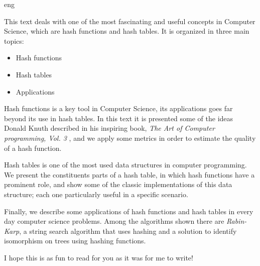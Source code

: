 \begin{resumo}{eng}
  
This text deals with one of the most fascinating and useful concepts in Computer Science, which are hash functions and hash tables. It is organized in three main topics:

\begin{itemize}
   \item Hash functions
   \item Hash tables
   \item Applications
\end{itemize}

Hash functions is a key tool in Computer Science, its applications goes far beyond its use in hash tables. In this text it is presented some of the ideas Donald Knuth described in his inspiring book, \textit{The Art of Computer programming, Vol. 3} \citep{TAOCP3}, and we apply some metrics in order to estimate the quality of a hash function.

Hash tables is one of the most used data structures in computer programming. We present the constituents parts of a hash table, in which hash functions have a prominent role, and show some of the classic implementations of this data structure; each one particularly useful in a specific scenario.

Finally, we describe some applications of hash functions and hash tables in every day computer science problems. Among the algorithms shown there are \textit{Rabin-Karp}, a string search algorithm that uses hashing and a solution to identify isomorphism on trees using hashing functions.

I hope this is as fun to read for you as it was for me to write!
\\

\end{resumo}
